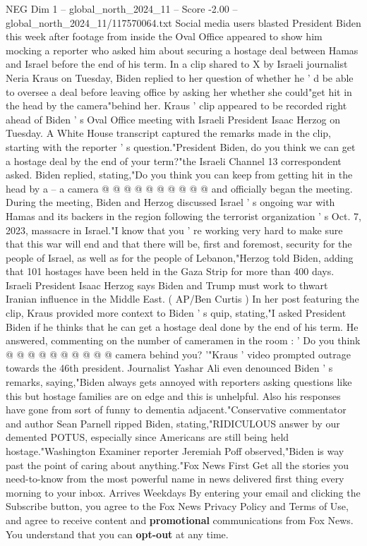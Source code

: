 \begin{textsample}{NEG Dim 1 – global\_north\_2024\_11 – Score -2.00 – global\_north\_2024\_11/117570064.txt}  \label{ex:f1_neg_109}
Social media users blasted President Biden this week after footage from inside the Oval Office appeared to show him mocking a reporter who asked him about securing a hostage deal between Hamas and Israel before the end of his term.
In a clip shared to X by Israeli journalist Neria Kraus on Tuesday, Biden replied to her question of whether he ' d be able to oversee a deal before leaving office by asking her whether she could"get hit in the head by the camera"behind her.
Kraus ' clip appeared to be recorded right ahead of Biden ' s Oval Office meeting with Israeli President Isaac Herzog on Tuesday.
A White House transcript captured the remarks made in the clip, starting with the reporter ' s question."President Biden, do you think we can get a hostage deal by the end of your term?"the Israeli Channel 13 correspondent asked.
Biden replied, stating,"Do you think you can keep from getting hit in the head by a -- a camera @ @ @ @ @ @ @ @ @ @ and officially began the meeting.
During the meeting, Biden and Herzog discussed Israel ' s ongoing war with Hamas and its backers in the region following the terrorist organization ' s Oct. 7, 2023, massacre in Israel."I know that you ' re working very hard to make sure that this war will end and that there will be, first and foremost, security for the people of Israel, as well as for the people of Lebanon,"Herzog told Biden, adding that 101 hostages have been held in the Gaza Strip for more than 400 days.
Israeli President Isaac Herzog says Biden and Trump must work to thwart Iranian influence in the Middle East. ( AP/Ben Curtis ) In her post featuring the clip, Kraus provided more context to Biden ' s quip, stating,"I asked President Biden if he thinks that he can get a hostage deal done by the end of his term.
He answered, commenting on the number of cameramen in the room : ' Do you think @ @ @ @ @ @ @ @ @ @ camera behind you? '"Kraus ' video prompted outrage towards the 46th president.
Journalist Yashar Ali even denounced Biden ' s remarks, saying,"Biden always gets annoyed with reporters asking questions like this but hostage families are on edge and this is unhelpful.
Also his responses have gone from sort of funny to dementia adjacent."Conservative commentator and author Sean Parnell ripped Biden, stating,"RIDICULOUS answer by our demented POTUS, especially since Americans are still being held hostage."Washington Examiner reporter Jeremiah Poff observed,"Biden is way past the point of caring about anything."Fox News First Get all the stories you need-to-know from the most powerful name in news delivered first thing every morning to your inbox.
Arrives Weekdays By entering your email and clicking the Subscribe button, you agree to the Fox News Privacy Policy and Terms of Use, and agree to receive content and \textbf{promotional} communications from Fox News.
You understand that you can \textbf{opt-out} at any time.

\end{textsample}
